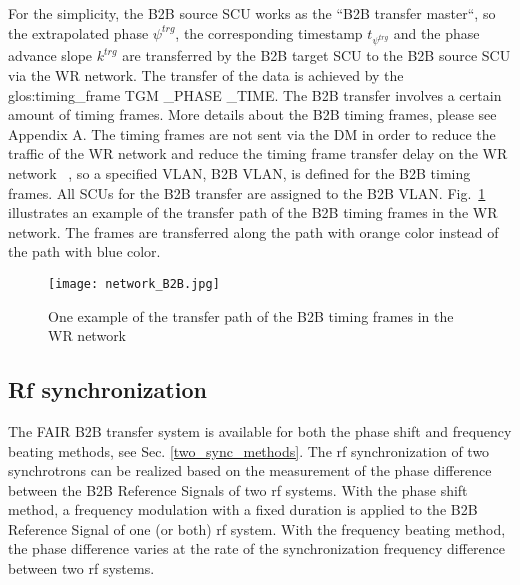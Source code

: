 For the simplicity, the B2B source SCU works as the ``B2B transfer master``, so the extrapolated phase $\psi^\mathit{trg}$, the corresponding timestamp $t_{\psi^\mathit{trg}}$ and the phase advance slope $k^\mathit{trg}$ are transferred by the B2B target SCU to the B2B source SCU via the WR network. The transfer of the data is achieved by the \gls{glos:timing_frame} TGM \_PHASE \_TIME. The B2B transfer involves a certain amount of timing frames. More details about the B2B timing frames, please see Appendix A. The timing frames are not sent via the DM in order to reduce the traffic of the WR network and reduce the timing frame transfer delay on the WR network ~\cite{bai_concept_2016}, so a specified VLAN, B2B \gls{VLAN}, is defined for the B2B timing frames. All SCUs for the B2B transfer are assigned to the B2B VLAN. Fig.~\ref{network_B2B} illustrates an example of the transfer path of the B2B timing frames in the WR network. The frames are transferred along the path with orange color instead of the path with blue color. 
 \begin{figure}[!htb]
   \centering   
   \texttt{[image: network\_B2B.jpg]}
   \caption{One example of the transfer path of the B2B timing frames in the WR network}
   \label{network_B2B}
\end{figure}
\subsection{Rf synchronization}
The FAIR B2B transfer system is available for both the phase shift and frequency beating methods, see Sec. \ref{two_sync_methods}. The rf synchronization of two synchrotrons can be realized based on the measurement of the phase difference between the B2B Reference Signals of two rf systems. With the phase shift method, a frequency modulation with a fixed duration is applied to the B2B Reference Signal of one (or both) rf system. With the frequency beating method, the phase difference varies at the rate of the synchronization frequency difference between two rf systems. 

